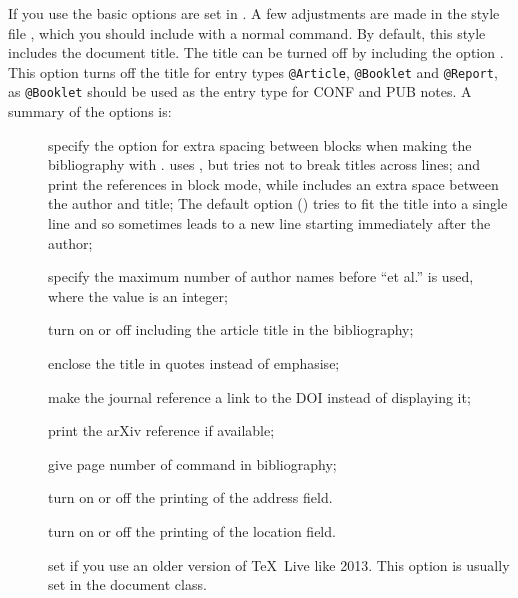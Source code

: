 \documentclass[UKenglish, texlive=2016]{atlasdoc}
\begin{document}
If you use  the basic options are set in .
A few adjustments are made in the style file ,
which you should include with a normal  command.
By default, this style includes the document title.
The title can be turned off by including the option .
This option turns off the title for entry types \texttt{@Article}, \texttt{@Booklet} and \texttt{@Report},
as \texttt{@Booklet} should be used as the entry type for CONF and PUB notes.
A summary of the options is:
\begin{description}
\item[] specify the option for extra spacing between blocks when making the bibliography with .
   uses , but tries not to break titles across lines;
   and  print the references in block mode, while  includes an extra space between the author and title;
  The default option () tries to fit the title into a single line
  and so sometimes leads to a new line starting immediately after the author;
\item[] specify the maximum number of author names before \enquote{et al.} is used, where the value is an integer;
\item[] turn on or off including the article title in the bibliography;
\item[] enclose the title in quotes instead of emphasise;
\item[] make the journal reference a link to the DOI instead of displaying it;
\item[] print the arXiv reference if available;
\item[] give page number of  command in bibliography;
\item[] turn on or off the printing of the address field.
\item[] turn on or off the printing of the location field.
\item[] set if you use an older version of \TeX\ Live like 2013.
  This option is usually set in the document class.
\end{description}
\end{document}
